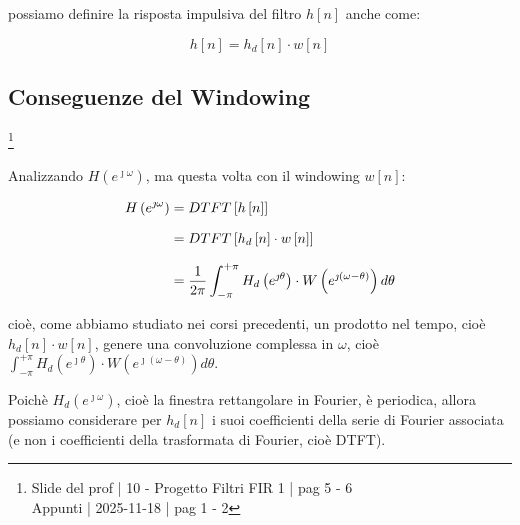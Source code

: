 possiamo definire la risposta impulsiva del filtro $h \left[ n\right]$ anche come: 

{
    \Large 
    \begin{equation}
        h \left[ n\right] 
        = 
        h_d \left[ n\right] 
        \cdot 
        w \left[ n\right]
    \end{equation}
}

\newpage 

\subsection{Conseguenze del Windowing} \label{subsec: Conseguenze del Windowing}

\footnote{ 
    Slide del prof | 10 - Progetto Filtri FIR 1 | pag 5 - 6\\
    Appunti | 2025-11-18 | pag 1 - 2 
} 

Analizzando $H \left(e^{\jmath \omega}\right)$, ma questa volta con il windowing $w \left[ n\right]$: 

{
    \Large 
    \begin{equation}
        \setlength{\jot}{10pt} %
        \begin{split}
            H \left(e^{\jmath \omega}\right) 
            &= 
            DTFT \left[ h \left[ n\right]\right] 
            \\
            &= 
            DTFT \left[ h_d \left[ n\right] \cdot w \left[ n\right]\right] 
            \\
            &= 
            \dfrac{1}{2 \pi} 
            \int_{- \pi}^{+ \pi} 
            H_d \left(e^{\jmath \theta}\right) 
            \cdot 
            W \left(e^{\jmath \left( \omega - \theta\right)}\right) 
            d \theta
        \end{split}
    \end{equation}
}

cioè, come abbiamo studiato nei corsi precedenti, un prodotto nel tempo, cioè $h_d \left[ n\right] \cdot w \left[ n\right]$, 
genere una convoluzione complessa in $\omega$, cioè $\int_{- \pi}^{+ \pi} H_d \left(e^{\jmath \theta}\right) \cdot W \left(e^{\jmath \left( \omega - \theta\right)}\right) d \theta$. \newline 

Poichè $H_d \left(e^{\jmath \omega}\right)$, cioè la finestra rettangolare in Fourier, è periodica, 
allora possiamo considerare per $h_d \left[ n\right]$ i suoi coefficienti della serie di Fourier associata (e non i coefficienti della trasformata di Fourier, cioè DTFT). \newline 

